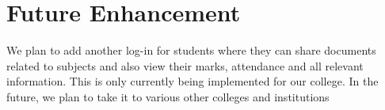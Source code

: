 \documentclass[BTech]{srmuthesis}
\begin{document}
\section{Future Enhancement}
We plan to add another log-in for students where they can share documents related to subjects and also view their marks, attendance and all relevant information. This is only currently being implemented for our college. In the future, we plan to take it to various other colleges and institutions

\begin{singlespace}
\end{singlespace}
\end{document}
